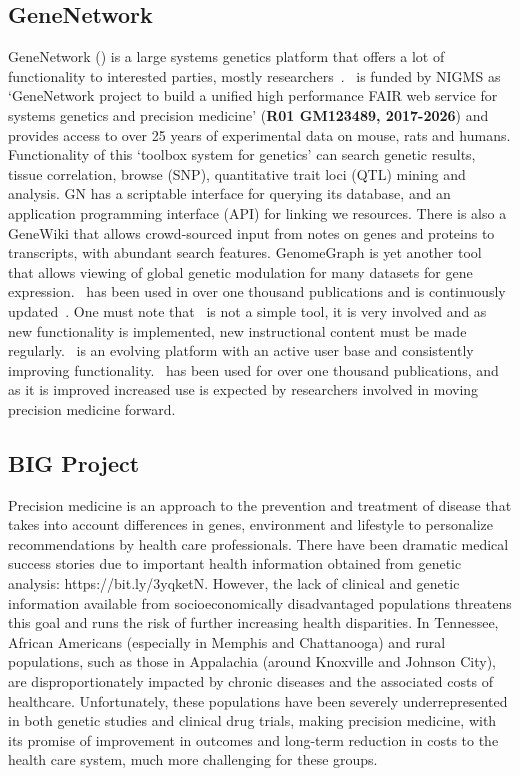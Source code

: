 \subsection{GeneNetwork}
GeneNetwork (\GN) is a large systems genetics platform that offers a lot of functionality to interested parties, mostly researchers~\cite{Williams:1994, Chesler:2004, Chesler:2005, Alberts:2010, Williams:2012, Mulligan:2017, Watson:2020}.
\GN\ is funded by NIGMS as `GeneNetwork project to build a unified high performance FAIR  web service for systems genetics and precision medicine' (\textbf{R01 GM123489, 2017-2026}) and provides access to over 25 years of experimental data on mouse, rats and humans.
Functionality of this `toolbox system for genetics' can search genetic results, tissue correlation, browse (SNP), quantitative trait loci (QTL) mining and analysis. GN has a scriptable interface for querying its database, and an application programming interface (API) for linking we resources.
There is also a GeneWiki that allows crowd-sourced input from notes on genes and proteins to transcripts, with abundant search features.
GenomeGraph is yet another tool that allows viewing of global genetic modulation for many datasets for gene expression.
\GN\ has been used in over one thousand publications and is continuously updated~\cite{Watson:2020}.
One must note that \GN\ is not a simple tool, it is very involved and as new functionality is implemented, new instructional content must be made regularly.
\GN\ is an evolving platform with an active user base and consistently improving functionality.
\GN\ has been used for over one thousand publications, and as it is improved increased use is  expected by researchers involved in moving precision medicine forward\cite{Watson:2020}.

\subsection{BIG Project}
Precision medicine is an approach to the prevention and treatment of disease that takes into account differences in genes, environment and lifestyle to personalize recommendations by health care professionals. 
There have been dramatic medical success stories due to important health information obtained from genetic analysis: https://bit.ly/3yqketN.
However, the lack of clinical and genetic information available from socioeconomically disadvantaged populations threatens this goal and runs the risk of further increasing health disparities. 
In Tennessee, African Americans (especially in Memphis and Chattanooga) and rural populations, such as those in Appalachia (around Knoxville and Johnson City), are disproportionately impacted by chronic diseases and the associated costs of healthcare. 
Unfortunately, these populations have been severely underrepresented in both genetic studies and clinical drug trials, making precision medicine, with its promise of improvement in outcomes and long-term reduction in costs to the health care system, much more challenging for these groups. 

